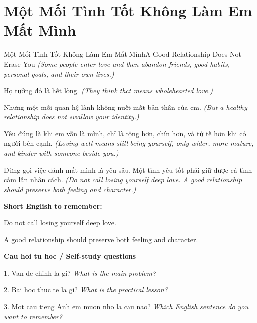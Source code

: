 \section{Một Mối Tình Tốt Không Làm Em Mất Mình}
\begin{truyen}{Một Mối Tình Tốt Không Làm Em Mất Mình}{A Good Relationship Does Not Erase You}
\textit{(Some people enter love and then abandon friends, good habits, personal goals, and their own lives.)}

Họ tưởng đó là hết lòng.
\textit{(They think that means wholehearted love.)}

Nhưng một mối quan hệ lành không nuốt mất bản thân của em.
\textit{(But a healthy relationship does not swallow your identity.)}

Yêu đúng là khi em vẫn là mình, chỉ là rộng hơn, chín hơn, và tử tế hơn khi có người bên cạnh.
\textit{(Loving well means still being yourself, only wider, more mature, and kinder with someone beside you.)}

\end{truyen}

\begin{baihoc}
Đừng gọi việc đánh mất mình là yêu sâu. Một tình yêu tốt phải giữ được cả tình cảm lẫn nhân cách.
\textit{(Do not call losing yourself deep love. A good relationship should preserve both feeling and character.)}
\end{baihoc}

\begin{ghinhoanh}
\textbf{Short English to remember:}

Do not call losing yourself deep love.

A good relationship should preserve both feeling and character.

\end{ghinhoanh}

\begin{tuhocnhanh}
\textbf{Cau hoi tu hoc / Self-study questions}

1. Van de chinh la gi? \textit{What is the main problem?}

2. Bai hoc thuc te la gi? \textit{What is the practical lesson?}

3. Mot cau tieng Anh em muon nho la cau nao? \textit{Which English sentence do you want to remember?}
\end{tuhocnhanh}
\ngancach

